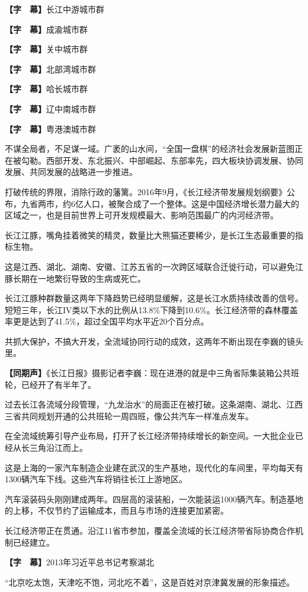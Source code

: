 \documentclass{ctexart}
\newcommand{\zkh}[1]{\textbf{\hspace{-2.7em} 【#1】}}
\begin{document}
\zkh{字　幕}长江中游城市群

\zkh{字　幕}成渝城市群

\zkh{字　幕}关中城市群

\zkh{字　幕}北部湾城市群

\zkh{字　幕}哈长城市群

\zkh{字　幕}辽中南城市群

\zkh{字　幕}粤港澳城市群

不谋全局者，不足谋一域。广袤的山水间，``全国一盘棋''的经济社会发展新蓝图正在被勾勒。西部开发、东北振兴、中部崛起、东部率先，四大板块协调发展、协同发展、共同发展的战略进一步推进。

打破传统的界限，消除行政的藩篱。2016年9月，《长江经济带发展规划纲要》公布，九省两市，约6亿人口，被聚合成了一个整体。这是中国经济增长潜力最大的区域之一，也是目前世界上可开发规模最大、影响范围最广的内河经济带。

长江江豚，嘴角挂着微笑的精灵，数量比大熊猫还要稀少，是长江生态最重要的指标生物。

这是江西、湖北、湖南、安徽、江苏五省的一次跨区域联合迁徙行动，可以避免江豚长期在一地繁衍导致的生病或死亡。

长江江豚种群数量这两年下降趋势已经明显缓解，这是长江水质持续改善的信号。短短三年，长江IV类以下水的比例从13.8{\%}下降到10.6{\%}。长江经济带的森林覆盖率更是达到了41.5{\%}，超过全国平均水平近20个百分点。

共抓大保护，不搞大开发，全流域协同行动的成效，这两年不断出现在李巍的镜头里。

\zkh{同期声}《长江日报》摄影记者李巍：现在进港的就是中三角省际集装箱公共班轮，已经开了有半年了。

过去长江各流域分段管理，``九龙治水''的局面正在被打破。这条湖南、湖北、江西三省共同规划开通的公共班轮一周四班，像公共汽车一样准点发车。

在全流域统筹引导产业布局，打开了长江经济带持续增长的新空间。一大批企业已经从长三角沿江而上。

这是上海的一家汽车制造企业建在武汉的生产基地，现代化的车间里，平均每天有1300辆汽车下线。这些汽车将销往长江上游地区。

汽车滚装码头刚刚建成两年。四层高的滚装船，一次能装运1000辆汽车。制造基地的上移，不仅节约了运输成本，而且与市场的连接更加紧密。

长江经济带正在贯通。沿江11省市参加，覆盖全流域的长江经济带省际协商合作机制已经建立。

\zkh{字　幕}2013年习近平总书记考察湖北

``北京吃太饱，天津吃不饱，河北吃不着''，这是百姓对京津冀发展的形象描述。
\end{document}
